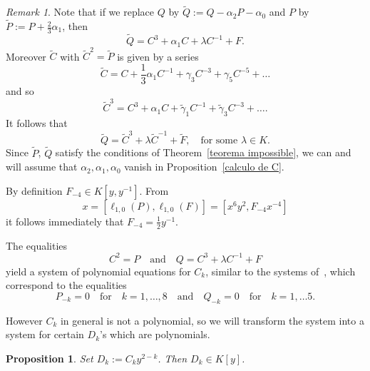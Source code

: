 \documentclass[reqno,a4paper,twoside]{amsart}
\newtheorem{proposition}[theorem]{Proposition}
\theoremstyle{definition}
\theoremstyle{remark}
\newtheorem{remark}[theorem]{Remark}
\begin{document}
\begin{remark}
  Note that if we replace $Q$ by $\tilde Q := Q - \alpha_2 P - \alpha_0$ and $P$ by $\tilde P:= P+\frac 23 \alpha_1$, then
$$
\tilde Q = C^3 +  \alpha_1 C +  \lambda C^{-1} + F.
$$
Moreover $\tilde C$ with $\tilde C^2=\tilde P$ is given by a series
$$
\tilde C=C+\frac 13 \alpha_1 C^{-1}+\gamma_3 C^{-3}+\gamma_5 C^{-5}+\dots
$$
and so
$$
\tilde C^3=C^3+\alpha_1 C+\tilde\gamma_1 C^{-1}+\tilde\gamma_3 C^{-3}+\dots.
$$
It follows that
$$
\tilde Q=\tilde C^3+\lambda \tilde C^{-1}+\tilde F,\quad\text{for some $\lambda\in K$}.
$$
Since  $\tilde P$, $\tilde Q$ satisfy the conditions of Theorem~\ref{teorema impossible}, we can and will assume that $\alpha_2,\alpha_1,\alpha_0$ vanish in Proposition~\ref{calculo de C}.
\end{remark}

By definition $F_{-4}\in K[y,y^{-1}]$. From
$$
x=[\ell_{1,0}(P),\ell_{1,0}(F)]=[x^6 y^2,F_{-4}x^{-4}]
$$
it follows immediately that $F_{-4}=\frac 12 y^{-1}$.

The equalities
\begin{equation}\label{ecuaciones basicas para 7}
C^2=P\quad\text{and}\quad Q=C^3+\lambda C^{-1}+F
\end{equation}
 yield a system of polynomial equations for $C_k$, similar to the systems of~\cite{GGV3}, which correspond to
the equalities
\begin{equation}\label{ecuaciones polinomiales para 7}
P_{-k}=0\quad\text{for}\quad k=1,\dots,8\quad\text{and}\quad Q_{-k}=0\quad\text{for}\quad k=1,\dots 5.
\end{equation}

However $C_k$ in general is not a polynomial, so we will transform the system into a system for certain $D_k$'s which are polynomials.


\begin{proposition}
Set $D_k:=C_k y^{2-k}$. Then $D_k\in K[y]$.
\end{proposition}
\end{document}
